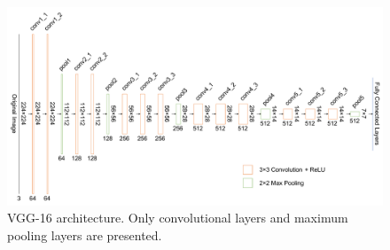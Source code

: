 \begin{figure}[!h]
	\centering
	\includegraphics[width=\fig\textwidth]{3-01.pdf}
    \caption[VGG-16 architecture]{VGG-16 architecture. Only convolutional layers and maximum pooling layers are presented.}
    \label{fig:vgg16}
\end{figure}